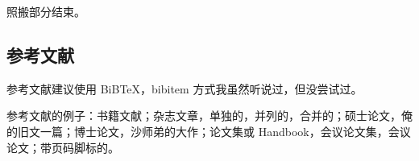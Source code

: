 {\youti 照搬部分结束。}

\subsection{参考文献}

参考文献建议使用 BiB\TeX，bibitem 方式我虽然听说过，但没尝试过。

参考文献的例子：书籍文献；杂志文章，单独的，并列的，合并的；硕士论文，俺的旧文一篇；博士论文，沙师弟的大作；论文集或 Handbook，会议论文集，会议论文；带页码脚标的。



